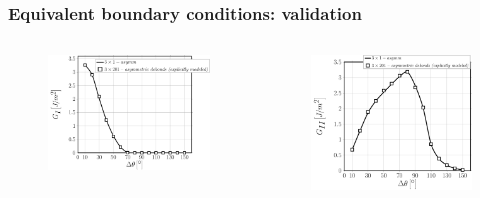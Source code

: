 \documentclass[first,firstsupp,lastsupp,last,hyperref,table]{ETHclass}
\begin{document}
\begin{frame}
\frametitle{\vspace{0.2cm}\small Equivalent boundary conditions: validation}
\vspace{-1.25cm}
\centering
\begin{columns}[c]
\begin{column}{0.5\textwidth}
\centering
\begin{figure}
\centering
\includegraphics[width=1.1\columnwidth]{asymm-vs-explmodel-vf60-GI.pdf}
\end{figure}
\end{column}
\begin{column}{0.5\textwidth}
\centering
\begin{figure}
\centering
\includegraphics[width=\columnwidth]{asymm-vs-explmodel-vf60-GII.pdf}
\end{figure}
\end{column}
\end{columns}
\end{frame}
\end{document}
